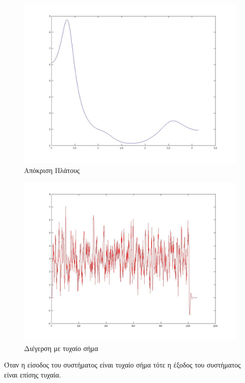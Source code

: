 \documentclass[a4paper,10pt]{article} \usepackage{anysize}
\begin{document}
\begin{figure}[H]
\caption{Απόκριση Πλάτους}
\centering
	\includegraphics[scale=0.4]{files/23-apokrish_platous.jpg}
\end{figure}

\begin{figure}[H]
\caption{Διέγερση με τυχαίο σήμα}
\centering
	\includegraphics[scale=0.4]{files/24-diegersh_me_tuxaio_shma.jpg}
\end{figure}
 Όταν η είσοδος του συστήματος είναι τυχαίο σήμα τότε η έξοδος του συστήματος
 είναι επίσης τυχαία.
\end{document}
